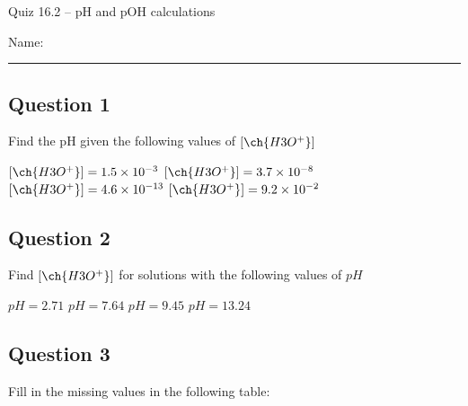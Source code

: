 \documentclass[11pt, letterpaper]{memoir}
\begin{document}
	\begin{center}
		{\large	Quiz 16.2 -- pH and pOH calculations}
	\end{center}
	{\large Name: \rule[-1mm]{4in}{.1pt} 
	
	
	\subsection*{Question 1}
	Find the pH given the following values of $\left[\ch{H3O^+}\right]$
	
	\noindent
	{\large $\left[\ch{H3O^+}\right] = 1.5\times10^{-3}$ \hspace{2em}  $\left[\ch{H3O^+}\right] = 3.7\times10^{-8}$ \hspace{2em}  $\left[\ch{H3O^+}\right] = 4.6\times10^{-13}$  \hspace{2em} $\left[\ch{H3O^+}\right] = 9.2\times10^{-2}$}
	
	\vspace{4em}
	\subsection*{Question 2}
	Find $\left[\ch{H3O^+}\right]$ for solutions with the following values of $pH$
	
	\noindent
	{\large $pH = 2.71$ \hspace{6em}  $pH = 7.64$ \hspace{6em}  $pH=9.45$  \hspace{6em} $pH = 13.24$}
	
	\vspace{4em}
	\subsection*{Question 3}
	Fill in the missing values in the following table:
	
}
\end{document}
